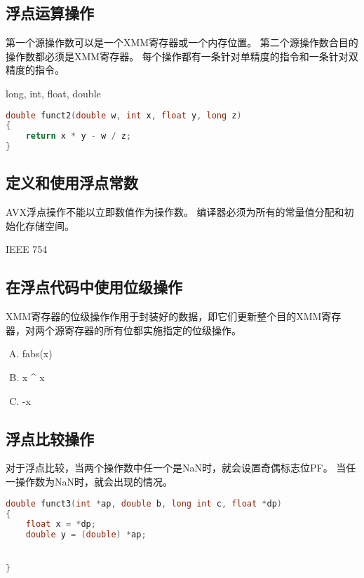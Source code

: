 {    \subsection{浮点运算操作}
    {
        第一个源操作数可以是一个XMM寄存器或一个内存位置。
        第二个源操作数合目的操作数都必须是XMM寄存器。
        每个操作都有一条针对单精度的指令和一条针对双精度的指令。

        \begin{practicec}
            long, int, float, double
        \end{practicec}

        \begin{practicec}
            \begin{lstlisting}[language=C]
double funct2(double w, int x, float y, long z)
{
    return x * y - w / z;
}
            \end{lstlisting}
        \end{practicec}
    }

    \subsection{定义和使用浮点常数}
    {
        AVX浮点操作不能以立即数值作为操作数。
        编译器必须为所有的常量值分配和初始化存储空间。

        \begin{practicec}
            IEEE 754
        \end{practicec}
    }

    \subsection{在浮点代码中使用位级操作}
    {
        XMM寄存器的位级操作作用于封装好的数据，即它们更新整个目的XMM寄存器，对两个源寄存器的所有位都实施指定的位级操作。

        \begin{practicec}
            \begin{enumerate}[A.]
                \item fabs(x)
                \item x ^ x
                \item -x
            \end{enumerate}
        \end{practicec}
    }

    \subsection{浮点比较操作}
    {
        对于浮点比较，当两个操作数中任一个是NaN时，就会设置奇偶标志位PF。
        当任一操作数为NaN时，就会出现的情况。

        \begin{practicec}
            \begin{lstlisting}[language=C]
double funct3(int *ap, double b, long int c, float *dp)
{
    float x = *dp;
    double y = (double) *ap;


}
            \end{lstlisting}
        \end{practicec}
    }
}
